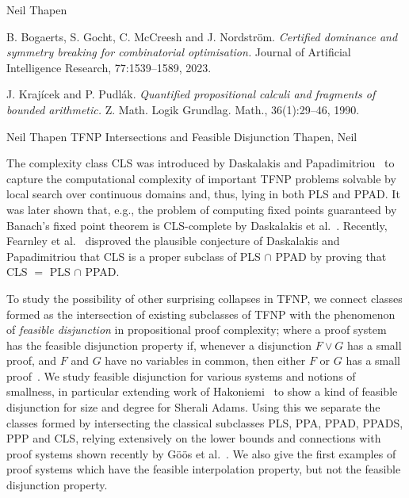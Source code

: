 \documentclass[report]{owrart}
\begin{document}
\begin{report}
\begin{talk}{Neil Thapen}
        \begin{thebibliography}{99}
        
    
B. Bogaerts, S. Gocht, C. McCreesh and J. Nordström. 
{\it Certified dominance and symmetry breaking for combinatorial optimisation.}
Journal of Artificial Intelligence Research, 77:1539–1589, 2023.


J. Krajícek and P. Pudlák. 
{\it Quantified propositional calculi and fragments of bounded arithmetic.}
Z. Math. Logik Grundlag. Math., 36(1):29–46, 1990.
        
        \end{thebibliography}
        
\end{talk}


    \begin{talk}{Neil Thapen}
           {TFNP Intersections and Feasible Disjunction}
           {Thapen, Neil}
           
           \noindent

           The complexity class CLS was introduced by Daskalakis and Papadimitriou~\cite{cls} to capture the computational complexity of important TFNP problems solvable by local search over continuous domains and, thus,
lying in both PLS and PPAD.
It was later shown that, e.g., the problem of computing fixed points guaranteed by Banach's fixed point theorem is CLS-complete by Daskalakis et al.~\cite{dtz_18}.
Recently, Fearnley et al.~\cite{fghs_23} disproved the plausible conjecture of Daskalakis and Papadimitriou that CLS is a proper subclass of PLS $\cap$ PPAD  by proving that CLS $=$ PLS $\cap$ PPAD.

To study the possibility of other surprising collapses in TFNP, we connect classes formed as the intersection of existing subclasses of TFNP with the phenomenon of \emph{feasible disjunction} in propositional proof complexity;
where a proof system has the feasible disjunction property if, whenever a disjunction $F  \vee  G$ has a small proof,
and $F$ and $G$ have no variables in common, then either $F$ or $G$ has a small proof~\cite{kra_95, pud_03}.
We study feasible disjunction for various systems and notions of smallness, in particular
extending work of Hakoniemi~\cite{hak} to show a kind of feasible
disjunction for size and degree for Sherali Adams.
Using this we separate the classes formed by intersecting the classical subclasses PLS, PPA, PPAD, PPADS, PPP and CLS,
relying extensively on the lower bounds and  connections with proof systems
shown recently by G\"o\"os et al.~\cite{goos}.
We also give the first examples of proof systems which have the feasible interpolation property, but not the feasible disjunction property.


\end{talk}
\end{report}
\end{document}
